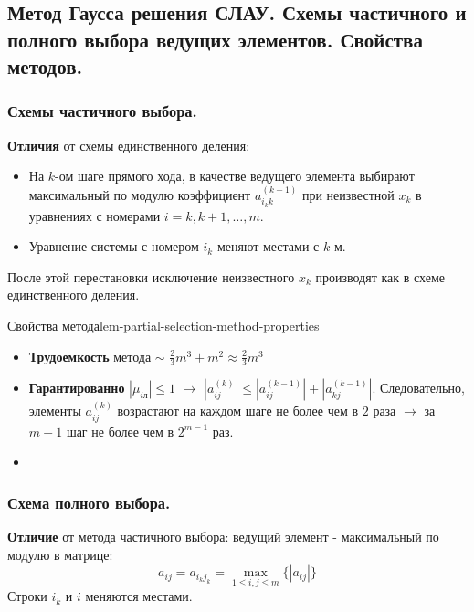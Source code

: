 \documentclass[14pt]{extarticle}
\begin{document}
\clearpage
\subsection{Метод Гаусса решения СЛАУ. Схемы частичного и полного выбора ведущих элементов. Свойства методов.}

    \subsubsection{Схемы частичного выбора.}

        \textbf{Отличия} от схемы единственного деления:
        \begin{itemize}
            \item На $k$-ом шаге прямого хода, в качестве ведущего элемента выбирают максимальный по модулю коэффициент $a_{i_{k}k}^{(k - 1)}$ при неизвестной $x_{k}$ в уравнениях с номерами $i = k, k+1, \ldots, m$.
            \item Уравнение системы с номером $i_{k}$ меняют местами с $k$-м. 
        \end{itemize}

        После этой перестановки исключение неизвестного $x_{k}$ производят как в схеме единственного деления.

        \begin{lemma}{Свойства метода}{lem-partial-selection-method-properties}
            \begin{itemize}
                \item \textbf{Трудоемкость} метода $\sim$ $\frac{2}{3} m^{3} + m^{2} \approx \frac{2}{3}m^{3}$
                \item \textbf{Гарантированно} $|\mu_{iл}| \leq 1$ $\rightarrow$ $|a_{ij}^{(k)}| \leq |a_{ij}^{(k - 1)}| + |a_{kj}^{(k - 1)}|$. Следовательно, элементы $a_{ij}^{(k)}$ возрастают на каждом шаге не более чем в $2$ раза $\rightarrow$ за $m - 1$ шаг не более чем в $2^{m - 1}$ раз.
                \item 
            \end{itemize}
        \end{lemma}

    \subsubsection{Схема полного выбора.}

        \textbf{Отличие} от метода частичного выбора: ведущий элемент - максимальный по модулю в матрице:
        $$a_{ij} = a_{i_{k}j_{k}} = \max_{1 \leq i, j \leq m}\{|a_{ij}|\}$$
        Строки $i_{k}$ и $i$ меняются местами.
\end{document}
